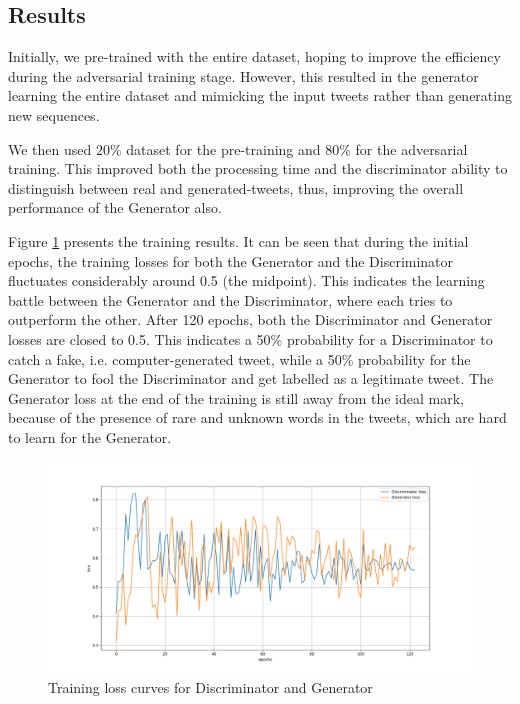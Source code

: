 \documentclass[conference]{IEEEtran}
\begin{document}
\subsection{Results}
Initially, we pre-trained with the entire dataset, hoping to improve the efficiency during the adversarial training stage. However, this resulted in the generator learning the entire dataset and mimicking the input tweets rather than generating new sequences.

We then used $ 20\% $ dataset for the pre-training and $ 80\% $ for the adversarial training. This improved both the processing time and the discriminator ability to distinguish between real and generated-tweets, thus, improving the overall performance of the Generator also.

Figure \ref{fig:Results} presents the training results. It can be seen that during the initial epochs, the training losses for both the Generator and the Discriminator fluctuates considerably around 0.5 (the midpoint). This indicates  the learning battle between the Generator and the Discriminator, where each tries to outperform the other. After 120 epochs, both the Discriminator and Generator losses are closed to 0.5. This indicates a 50\% probability for a Discriminator to catch a fake, i.e. computer-generated tweet, while a 50\% probability for the Generator to fool the Discriminator and get labelled as a legitimate tweet. The Generator loss at the end of the training is still away from the ideal mark, because of the presence of rare and unknown words in the tweets, which are hard to learn for the Generator. 

\begin{figure}
	\centering
	\includegraphics[width=\columnwidth]{images/Figure_6.png}
	\caption{Training loss curves for Discriminator and Generator}	
	\label{fig:Results}
\end{figure}
\end{document}
